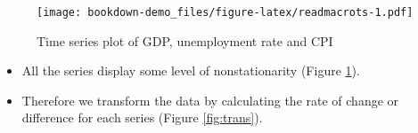 \documentclass[]{book}
\newenvironment{Shaded}{\begin{snugshade}}{\end{snugshade}}
\newcommand{\DataTypeTok}[1]{\textcolor[rgb]{0.13,0.29,0.53}{#1}}
\newcommand{\KeywordTok}[1]{\textcolor[rgb]{0.13,0.29,0.53}{\textbf{#1}}}
\newcommand{\NormalTok}[1]{#1}
\newcommand{\OperatorTok}[1]{\textcolor[rgb]{0.81,0.36,0.00}{\textbf{#1}}}
\newcommand{\StringTok}[1]{\textcolor[rgb]{0.31,0.60,0.02}{#1}}
\providecommand{\tightlist}{%
  \setlength{\itemsep}{0pt}\setlength{\parskip}{0pt}}
\begin{document}
\begin{Shaded}
\end{Shaded}

\begin{figure}
\centering
\texttt{[image: bookdown-demo\_files/figure-latex/readmacrots-1.pdf]}
\caption{\label{fig:readmacrots}Time series plot of GDP, unemployment rate and CPI}
\end{figure}

\begin{itemize}
\tightlist
\item
  All the series display some level of nonstationarity (Figure \ref{fig:readmacrots}).
\item
  Therefore we transform the data by calculating the rate of change or difference for each series (Figure \ref{fig:trans}).
\end{itemize}
\end{document}
